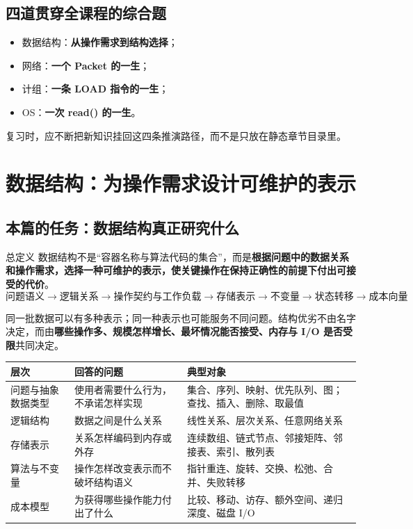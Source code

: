 \documentclass[11pt,a4paper,openany]{ctexbook}
\newcommand{\key}[1]{\textbf{\color{deep}#1}}
\begin{document}
\section{四道贯穿全课程的综合题}
\begin{itemize}
  \item 数据结构：\key{从操作需求到结构选择}；
  \item 网络：\key{一个 Packet 的一生}；
  \item 计组：\key{一条 LOAD 指令的一生}；
  \item OS：\key{一次 read() 的一生}。
\end{itemize}
复习时，应不断把新知识挂回这四条推演路径，而不是只放在静态章节目录里。

\chapter{数据结构：为操作需求设计可维护的表示}

\section{本篇的任务：数据结构真正研究什么}

\begin{corebox}{总定义}
数据结构不是“容器名称与算法代码的集合”，而是\textbf{根据问题中的数据关系和操作需求，选择一种可维护的表示，使关键操作在保持正确性的前提下付出可接受的代价}。
\[
\boxed{\text{问题语义}\rightarrow\text{逻辑关系}\rightarrow\text{操作契约与工作负载}\rightarrow\text{存储表示}\rightarrow\text{不变量}\rightarrow\text{状态转移}\rightarrow\text{成本向量}}
\]
\end{corebox}

同一批数据可以有多种表示；同一种表示也可能服务不同问题。结构优劣不由名字决定，而由\key{哪些操作多、规模怎样增长、最坏情况能否接受、内存与 I/O 是否受限}共同决定。

\begin{longtable}{p{2.7cm}p{4.0cm}p{\dimexpr\linewidth-7.97cm\relax}}
\toprule
\textbf{层次} & \textbf{回答的问题} & \textbf{典型对象}\\
\midrule
问题与抽象数据类型 & 使用者需要什么行为，不承诺怎样实现 & 集合、序列、映射、优先队列、图；查找、插入、删除、取最值\\
\midrule
逻辑结构 & 数据之间是什么关系 & 线性关系、层次关系、任意网络关系\\
\midrule
存储表示 & 关系怎样编码到内存或外存 & 连续数组、链式节点、邻接矩阵、邻接表、索引、散列表\\
\midrule
算法与不变量 & 操作怎样改变表示而不破坏结构语义 & 指针重连、旋转、交换、松弛、合并、失败转移\\
\midrule
成本模型 & 为获得哪些操作能力付出了什么 & 比较、移动、访存、额外空间、递归深度、磁盘 I/O\\
\bottomrule
\end{longtable}
\end{document}
